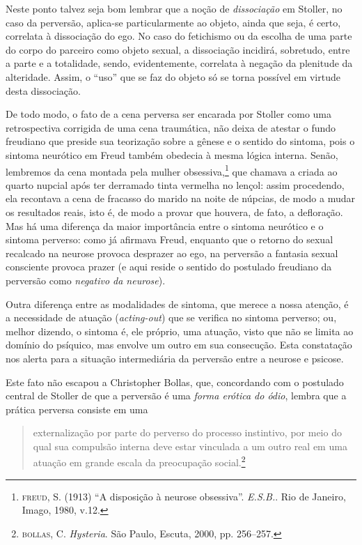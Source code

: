 Neste ponto talvez seja bom lembrar que a noção de \textit{dissociação} em
Stoller, no caso da perversão, aplica-se particularmente ao objeto, ainda
que seja, é certo, correlata à dissociação do ego. No caso do fetichismo ou
da escolha de uma parte do corpo do parceiro como objeto sexual, a
dissociação incidirá, sobretudo, entre a parte e a totalidade, sendo,
evidentemente, correlata à negação da plenitude da alteridade. Assim, o
“uso” que se faz do objeto só se torna possível em virtude desta
dissociação.

De todo modo, o fato de a cena perversa ser encarada por Stoller como uma
retrospectiva corrigida de uma cena traumática, não deixa de atestar o
fundo freudiano que preside sua teorização sobre a gênese e o sentido do
sintoma, pois o sintoma neurótico em Freud também obedecia à mesma lógica
interna. Senão, lembremos da cena montada pela mulher obsessiva,\footnote{ \textsc{freud}, S. 
(1913) “A disposição à neurose obsessiva”. \textit{E.S.B.}. Rio
de Janeiro, Imago, 1980, v.12.} que chamava a criada ao quarto nupcial
após ter derramado tinta vermelha no lençol: assim procedendo, ela
recontava a cena de fracasso do marido na noite de núpcias, de modo a mudar
os resultados reais, isto é, de modo a provar que houvera, de fato, a
defloração. Mas há uma diferença da maior importância entre o sintoma
neurótico e o sintoma perverso: como já afirmava Freud, enquanto que o
retorno do sexual recalcado na neurose provoca desprazer ao ego, na
perversão a fantasia sexual consciente provoca prazer (e aqui reside o
sentido do postulado freudiano da perversão como \textit{negativo da
neurose}).

Outra diferença entre as modalidades de sintoma, que merece a nossa atenção,
é a necessidade de atuação (\textit{acting-out}) que se verifica no sintoma
perverso; ou, melhor dizendo, o sintoma é, ele próprio, uma atuação, visto
que não se limita ao domínio do psíquico, mas envolve um outro em sua
consecução. Esta constatação nos alerta para a situação intermediária da
perversão entre a neurose e psicose.

Este fato não escapou a Christopher Bollas, que, concordando
com o postulado central de Stoller de que a perversão é uma \textit{forma
erótica do ódio}, lembra que a prática perversa consiste em uma

\begin{quote}
externalização por parte do perverso do processo instintivo, por meio do
qual sua compulsão interna deve estar vinculada a um outro real em uma
atuação em grande escala da preocupação social.\footnote{ \textsc{bollas}, C.
\textit{Hysteria}. São Paulo, Escuta, 2000, pp. 256--257.} 
\end{quote}

